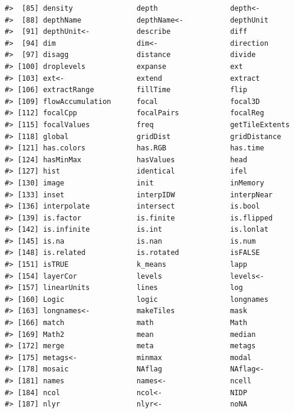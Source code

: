 \documentclass[
]{book}
\begin{document}
\begin{verbatim}
#>  [85] density               depth                 depth<-              
#>  [88] depthName             depthName<-           depthUnit            
#>  [91] depthUnit<-           describe              diff                 
#>  [94] dim                   dim<-                 direction            
#>  [97] disagg                distance              divide               
#> [100] droplevels            expanse               ext                  
#> [103] ext<-                 extend                extract              
#> [106] extractRange          fillTime              flip                 
#> [109] flowAccumulation      focal                 focal3D              
#> [112] focalCpp              focalPairs            focalReg             
#> [115] focalValues           freq                  getTileExtents       
#> [118] global                gridDist              gridDistance         
#> [121] has.colors            has.RGB               has.time             
#> [124] hasMinMax             hasValues             head                 
#> [127] hist                  identical             ifel                 
#> [130] image                 init                  inMemory             
#> [133] inset                 interpIDW             interpNear           
#> [136] interpolate           intersect             is.bool              
#> [139] is.factor             is.finite             is.flipped           
#> [142] is.infinite           is.int                is.lonlat            
#> [145] is.na                 is.nan                is.num               
#> [148] is.related            is.rotated            isFALSE              
#> [151] isTRUE                k_means               lapp                 
#> [154] layerCor              levels                levels<-             
#> [157] linearUnits           lines                 log                  
#> [160] Logic                 logic                 longnames            
#> [163] longnames<-           makeTiles             mask                 
#> [166] match                 math                  Math                 
#> [169] Math2                 mean                  median               
#> [172] merge                 meta                  metags               
#> [175] metags<-              minmax                modal                
#> [178] mosaic                NAflag                NAflag<-             
#> [181] names                 names<-               ncell                
#> [184] ncol                  ncol<-                NIDP                 
#> [187] nlyr                  nlyr<-                noNA                 

\end{verbatim}
\end{document}
